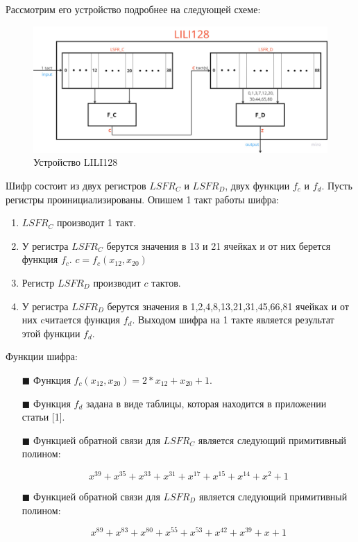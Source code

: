 \documentclass[colorthm]{./civarticle}
\begin{document}
Рассмотрим его устройство подробнее на следующей схеме:

\begin{figure}[H]
    \centering
    \includegraphics[width=0.8\linewidth]{my_lili_scheme.jpg}
    \caption{Устройство LILI128}
    \label{fig:enter-label}
\end{figure}

Шифр состоит из двух регистров $LSFR_C$ и $LSFR_D$, двух функции $f_c$ и $f_d$. Пусть регистры проинициализированы. Опишем 1 такт работы шифра:

\begin{enumerate}
        \item $LSFR_C$ производит 1 такт.
        \item У регистра $LSFR_C$ берутся значения в 13 и 21 ячейках и от них берется функция $f_c$. \newline $c = f_c(x_{12}, x_{20})$
        \item Регистр $LSFR_D$ производит $c$ тактов.
        \item У регистра $LSFR_D$ берутся значения в 1,2,4,8,13,21,31,45,66,81 ячейках и от них cчитается функция $f_d$. Выходом шифра на 1 такте является результат этой функции $f_d$.
\end{enumerate}

Функции шифра:
\begin{itemize}
    \item[$\blacksquare$]Функция $f_c(x_{12}, x_{20}) = 2*x_{12}+x_{20}+1$.
    \item[$\blacksquare$]Функция $f_d$ задана в виде таблицы, которая находится в приложении статьи [1].
    \item[$\blacksquare$]Функцией обратной связи для $LSFR_C$ является следующий примитивный полином:

    \begin{equation}
        x^{39}+x^{35}+x^{33}+x^{31}+x^{17}+x^{15}+x^{14}+x^2+1
    \end{equation}

    \item[$\blacksquare$]Функцией обратной связи для $LSFR_D$ является следующий примитивный полином:

    \begin{equation}
        x^{89}+x^{83}+x^{80}+x^{55}+x^{53}+x^{42}+x^{39}+x+1
    \end{equation}

\end{itemize}
\end{document}
